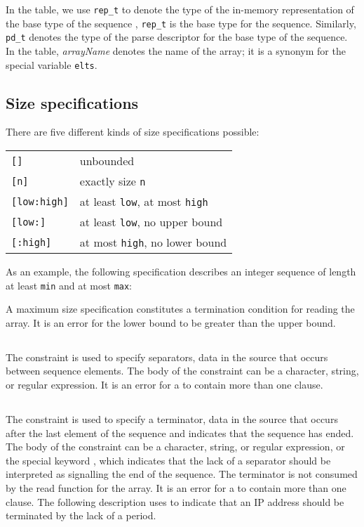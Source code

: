 \noindent
In the table, we use \texttt{rep\_t} to denote the type of the
in-memory representation of the base type of the sequence \ie{},
\texttt{rep\_t} is the base type for the sequence.  Similarly,
\texttt{pd\_t} denotes the type of the parse descriptor for the base
type of the sequence. In the table, \textit{arrayName} denotes the
name of the array; it is a synonym for the special variable \texttt{elts}.


\subsection{Size specifications}
\label{sec:array-size-spec}
There are five different kinds of size specifications possible:
			
\begin{center}	   
\begin{tabular}{ll}
  \texttt{[]}         & unbounded \\
  \texttt{[n]}        & exactly size \texttt{n}\\
  \texttt{[low:high]} & at least \texttt{low}, at most \texttt{high}\\
  \texttt{[low:]}     & at least \texttt{low}, no upper bound\\
  \texttt{[:high]}    & at most  \texttt{high}, no lower bound\\
\end{tabular}
\end{center} 

\noindent
As an example, the following specification describes an integer
sequence of length at least \texttt{min} and at most \texttt{max}:

%
\noindent
A maximum size specification constitutes a termination condition for
reading the array.  It is an error for the lower bound to be greater
than the upper bound.

\subsection{\Psep}
The \Psep{} constraint is used to specify separators, \ie{} data in
the source that occurs between sequence elements.  The body of the
\Psep{} constraint can be a character, string, or regular expression. 
It is an error for a \Parray{} to contain more than one \Psep{} clause.

\subsection{\Pterm}
The \Pterm{} constraint is used to specify a terminator, \ie{} data in
the source that occurs after the last element of the sequence and
indicates that the sequence has ended.  The body of the \Pterm{}
constraint can be a character, string, or regular expression, or the
special keyword \Pnosep{}, which indicates that the lack of a
separator should be interpreted as signalling the end of the
sequence.   The terminator is not consumed by the read function for
the array. 
It is an error for a \Parray{} to contain more than one \Pterm{} clause.
The following description uses \Pnosep{} to indicate that
an IP address should be terminated by the lack of a period.

